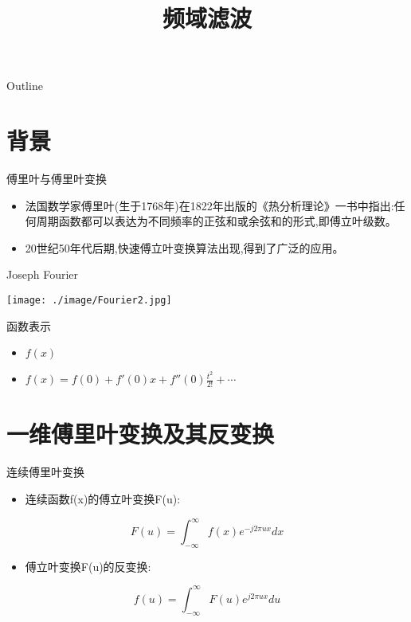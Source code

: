 \documentclass[presentation]{beamer}
\date{}
\title{频域滤波}
\begin{document}
\maketitle
\begin{frame}{Outline}
\tableofcontents
\end{frame}











\section{背景}
\label{sec:orga2b8bad}
\begin{frame}[label={sec:org547c911}]{傅里叶与傅里叶变换}
\begin{itemize}
\item 法国数学家傅里叶(生于1768年)在1822年出版的《热分析理论》一书中指出:任何周期函数都可以表达为不同频率的正弦和或余弦和的形式,即傅立叶级数。
\item 20世纪50年代后期,快速傅立叶变换算法出现,得到了广泛的应用。
\end{itemize}
\end{frame}
\begin{frame}[label={sec:org7c95ee7}]{Joseph Fourier}
\begin{center}
\begin{center}
\texttt{[image: ./image/Fourier2.jpg]}
\end{center}
\end{center}
\end{frame}
\begin{frame}[label={sec:org7128983}]{函数表示}
\begin{itemize}
\item \(f(x)\)
\item \(f(x)=f(0)+f'(0)x+f''(0)\frac{t^2}{2!}+\cdots\)
\end{itemize}
\end{frame}

\section{一维傅里叶变换及其反变换}
\label{sec:org994f1ac}
\begin{frame}[label={sec:org773af72}]{连续傅里叶变换}
\begin{itemize}
\item 连续函数f(x)的傅立叶变换F(u):
\end{itemize}
\[ F(u) = \int_{-\infty}^{\infty}f(x) e^{-j2\pi ux}dx \]
\begin{itemize}
\item 傅立叶变换F(u)的反变换:
\end{itemize}
\[ f(u) = \int_{-\infty}^{\infty}F(u) e^{j2\pi ux}du \]
\end{frame}
\end{document}
